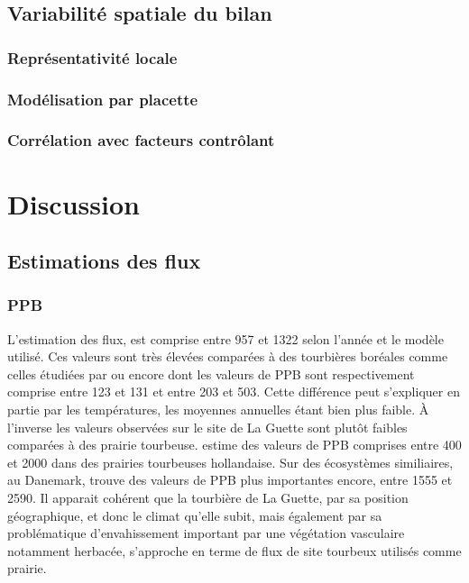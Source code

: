 \subsection{Variabilité spatiale du bilan}

\subsubsection{Représentativité locale}

\subsubsection{Modélisation par placette}

\subsubsection{Corrélation avec facteurs contrôlant}

\section{Discussion}

\subsection{Estimations des flux}

\subsubsection{PPB}

%

L'estimation des flux, est comprise entre 957 et \SI{1322}{\gcma} selon l'année et le modèle utilisé.
Ces valeurs sont très élevées comparées à des tourbières boréales comme celles étudiées par \cite{trudeau2014} ou encore \cite{peichl2014} dont les valeurs de PPB sont respectivement comprise entre 123 et \SI{131}{\gcma} et entre 203 et \SI{503}{\gcma}.
Cette différence peut s'expliquer en partie par les températures, les moyennes annuelles étant bien plus faible.
À l'inverse les valeurs observées sur le site de La Guette sont plutôt faibles comparées à des prairie tourbeuse.
\cite{jacobs2007} estime des valeurs de PPB comprises entre 400 et \SI{2000}{\gcma} dans des prairies tourbeuses hollandaise.
Sur des écosystèmes similiaires, au Danemark, \cite{gorres2014} trouve des valeurs de PPB plus importantes encore, entre 1555 et \SI{2590}{\gcma}.
Il apparait cohérent que la tourbière de La Guette, par sa position géographique, et donc le climat qu'elle subit, mais également par sa problématique d'envahissement important par une végétation vasculaire notamment herbacée, s'approche en terme de flux de site tourbeux utilisés comme prairie.
%
%
%
%

